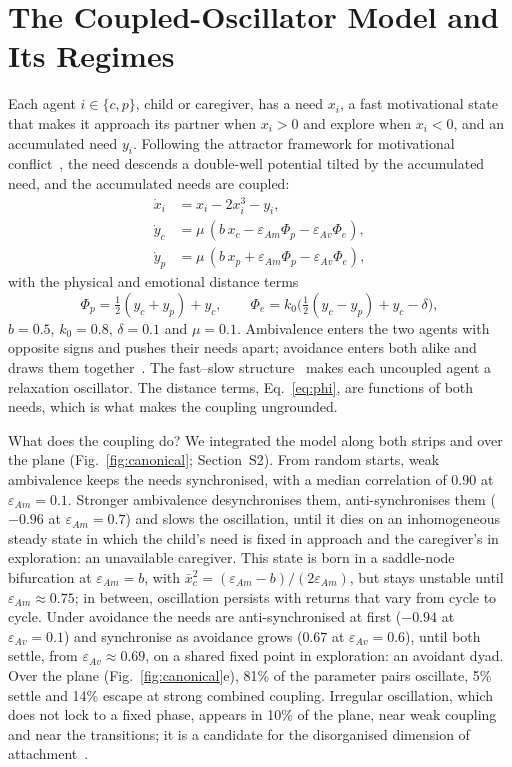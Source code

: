 \documentclass[journal]{IEEEtran}
\newcommand{\eav}{\varepsilon_{Av}}
\newcommand{\eam}{\varepsilon_{Am}}
\begin{document}
\section{The Coupled-Oscillator Model and Its Regimes}
\label{sec:model}

Each agent $i\in\{c,p\}$, child or caregiver, has a need $x_i$, a fast motivational state that makes it approach its partner when $x_i>0$ and explore when $x_i<0$, and an accumulated need $y_i$. Following the attractor framework for motivational conflict~\cite{Jimenez2020framework,Prescott2025plm}, the need descends a double-well potential tilted by the accumulated need, and the accumulated needs are coupled:
\begin{align}
\dot{x}_i &= x_i - 2x_i^3 - y_i, \label{eq:fast}\\
\dot{y}_c &= \mu\,(b\,x_c - \eam\Phi_p - \eav\Phi_e), \nonumber\\
\dot{y}_p &= \mu\,(b\,x_p + \eam\Phi_p - \eav\Phi_e), \label{eq:slow}
\end{align}
with the physical and emotional distance terms
\begin{equation}
\Phi_p = \tfrac{1}{2}(y_c+y_p) + y_c,\qquad \Phi_e = k_0\big(\tfrac{1}{2}(y_c-y_p) + y_c - \delta\big),
\label{eq:phi}
\end{equation}
$b=0.5$, $k_0=0.8$, $\delta=0.1$ and $\mu=0.1$. Ambivalence enters the two agents with opposite signs and pushes their needs apart; avoidance enters both alike and draws them together~\cite{Dixit2019dynamics}. The fast--slow structure~\cite{Bertram2017} makes each uncoupled agent a relaxation oscillator. The distance terms, Eq.~\eqref{eq:phi}, are functions of both needs, which is what makes the coupling ungrounded.

What does the coupling do? We integrated the model along both strips and over the plane (Fig.~\ref{fig:canonical}; Section~S2). From random starts, weak ambivalence keeps the needs synchronised, with a median correlation of 0.90 at $\eam=0.1$. Stronger ambivalence desynchronises them, anti-synchronises them ($-0.96$ at $\eam=0.7$) and slows the oscillation, until it dies on an inhomogeneous steady state in which the child's need is fixed in approach and the caregiver's in exploration: an unavailable caregiver. This state is born in a saddle-node bifurcation at $\eam=b$, with $\bar{x}_c^2=(\eam-b)/(2\eam)$, but stays unstable until $\eam\approx0.75$; in between, oscillation persists with returns that vary from cycle to cycle. Under avoidance the needs are anti-synchronised at first ($-0.94$ at $\eav=0.1$) and synchronise as avoidance grows ($0.67$ at $\eav=0.6$), until both settle, from $\eav\approx0.69$, on a shared fixed point in exploration: an avoidant dyad. Over the plane (Fig.~\ref{fig:canonical}e), 81\% of the parameter pairs oscillate, 5\% settle and 14\% escape at strong combined coupling. Irregular oscillation, which does not lock to a fixed phase, appears in 10\% of the plane, near weak coupling and near the transitions; it is a candidate for the disorganised dimension of attachment~\cite{Gagliardi2021our}.
\end{document}
